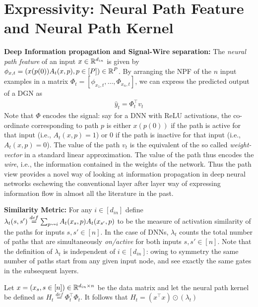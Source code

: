 \section{Expressivity: Neural Path Feature and Neural Path Kernel}
\textbf{Deep Information propagation and Signal-Wire separation:} The \emph{neural path feature} of an input $x\in \mathbb{R}^{d_{in}}$ is given by $\phi_{x,t}=(x(p(0))A_t(x,p) ,p\in[P])\in\mathbb{R}^P$. By arranging the NPF of the $n$ input examples in a matrix $\Phi_t=\left[\phi_{x_1,t},\ldots, \Phi_{x_n,t}\right]$, we can express the predicted output of a DGN as \begin{align}\hat{y}_t=\Phi_t^\top v_t\end{align} Note that $\Phi$ encodes the signal: say for a DNN with ReLU activations, the co-ordinate corresponding to path $p$ is either $x(p(0))$ if the path is active for that input (i.e., $A_t(x,p)=1$) or $0$ if the path is inactive for that input  (i.e., $A_t(x,p)=0$). The value of the path $v_t$ is the equivalent of the so called \emph{weight-vector} in a standard linear approximation. The value of the path thus encodes the \emph{wire}, i.e., the information contained in the weights of the network. Thus the path view provides a novel way of looking at information propagation in deep neural networks eschewing the conventional layer after layer way of expressing information flow in almost all the literature in the past.

\textbf{Similarity Metric:} For any $i\in [d_{in}]$ define $\lambda_t(s,s')\stackrel{def}{=}\sum_{p\rightsquigarrow i} A_t(x_s,p) A_t(x_{s'},p)$ to be the measure of activation similarity of the paths for inputs $s,s'\in[n]$. In the case of DNNs, $\lambda_t$ counts the total number of paths that are simultaneously \emph{on/active} for both inputs $s,s'\in[n]$. Note that the definition of $\lambda_t$ is independent of $i\in [d_{in}]$: owing to symmetry the same number of paths start from any given input node, and see exactly the same gates in the subsequent layers.

\begin{lemma} Let $x=(x_s,s\in [n])\in\mathbb{R}^{d_{in}\times n}$ be the data matrix and let the neural path kernel be defined as $H_t\stackrel{def}=\Phi^\top_t\Phi_t$. It follows that $H_t= (x^\top x)\odot(\lambda_t)$ \end{lemma}





